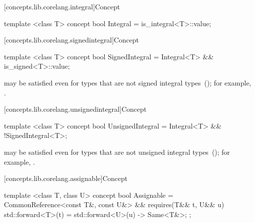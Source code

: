 [concepts.lib.corelang.integral]{Concept }

%
\begin{itemdecl}
template <class T>
concept bool Integral = is_integral<T>::value;
\end{itemdecl}

[concepts.lib.corelang.signedintegral]{Concept }

%
\begin{itemdecl}
template <class T>
concept bool SignedIntegral = Integral<T> && is_signed<T>::value;
\end{itemdecl}

\begin{itemdescr}
\pnum
\enternote {} may be satisfied even for
types that are not signed integral types~();
for example, .
\exitnote
\end{itemdescr}

[concepts.lib.corelang.unsignedintegral]{Concept }

%
\begin{itemdecl}
template <class T>
concept bool UnsignedIntegral = Integral<T> && !SignedIntegral<T>;
\end{itemdecl}

\begin{itemdescr}
\pnum
\enternote {} may be satisfied even for
types that are not unsigned integral types~();
for example, .
\exitnote
\end{itemdescr}

[concepts.lib.corelang.assignable]{Concept }

%
\begin{itemdecl}
template <class T, class U>
concept bool Assignable =
  CommonReference<const T&, const U&> && requires(T&& t, U&& u) {
    { std::forward<T>(t) = std::forward<U>(u) } -> Same<T&>;
  };
\end{itemdecl}

